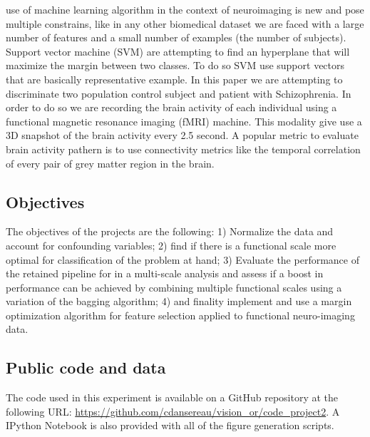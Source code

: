 \documentclass[12pt,journal,compsoc]{IEEEtran}
\begin{document}
 use of machine learning algorithm in the context of neuroimaging is new and pose multiple constrains, like in any other biomedical dataset we are faced with a large number of features and a small number of examples (the number of subjects). Support vector machine (SVM) \cite{Cortes1995} are attempting to find an hyperplane that will maximize the margin between two classes. To do so SVM use support vectors that are basically representative example. In this paper we are attempting to discriminate two population control subject and patient with Schizophrenia. In order to do so we are recording the brain activity of each individual using a functional magnetic resonance imaging (fMRI) machine. This modality give use a 3D snapshot of the brain activity every 2.5 second. A popular metric to evaluate brain activity pathern is to use connectivity metrics like the temporal correlation of every pair of grey matter region in the brain.



\subsection{Objectives}
The objectives of the projects are the following: 1) Normalize the data and account for confounding variables; 2) find if there is a functional scale more optimal for classification of the problem at hand; 3) Evaluate the performance of the retained pipeline for in a multi-scale analysis and assess if a boost in performance can be achieved by combining multiple functional scales using a variation of the bagging algorithm; 4) and finality implement and use a margin optimization algorithm for feature selection applied to functional neuro-imaging data.

\subsection{Public code and data}
The code used in this experiment is available on a 
GitHub repository at the following URL: \url{https://github.com/cdansereau/vision_or/code_project2}. A IPython Notebook is also provided with all of the figure generation scripts.



\end{document}
